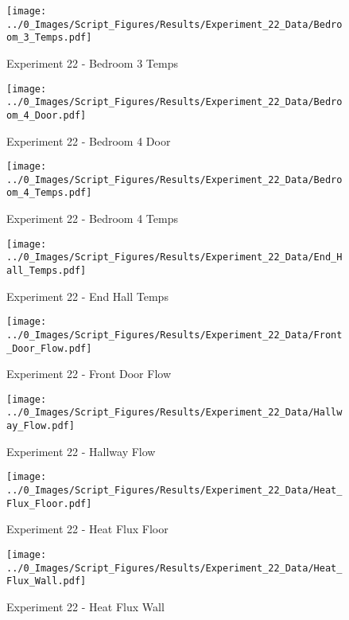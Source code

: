 	\begin{figure}[H]
		\centering
		\texttt{[image: ../0\_Images/Script\_Figures/Results/Experiment\_22\_Data/Bedroom\_3\_Temps.pdf]}
		\caption[]{Experiment 22 - Bedroom 3 Temps}
	\end{figure}
 
	\clearpage

	\begin{figure}[H]
		\centering
		\texttt{[image: ../0\_Images/Script\_Figures/Results/Experiment\_22\_Data/Bedroom\_4\_Door.pdf]}
		\caption[]{Experiment 22 - Bedroom 4 Door}
	\end{figure}
 

	\begin{figure}[H]
		\centering
		\texttt{[image: ../0\_Images/Script\_Figures/Results/Experiment\_22\_Data/Bedroom\_4\_Temps.pdf]}
		\caption[]{Experiment 22 - Bedroom 4 Temps}
	\end{figure}
 
	\clearpage

	\begin{figure}[H]
		\centering
		\texttt{[image: ../0\_Images/Script\_Figures/Results/Experiment\_22\_Data/End\_Hall\_Temps.pdf]}
		\caption[]{Experiment 22 - End Hall Temps}
	\end{figure}
 

	\begin{figure}[H]
		\centering
		\texttt{[image: ../0\_Images/Script\_Figures/Results/Experiment\_22\_Data/Front\_Door\_Flow.pdf]}
		\caption[]{Experiment 22 - Front Door Flow}
	\end{figure}
 
	\clearpage

	\begin{figure}[H]
		\centering
		\texttt{[image: ../0\_Images/Script\_Figures/Results/Experiment\_22\_Data/Hallway\_Flow.pdf]}
		\caption[]{Experiment 22 - Hallway Flow}
	\end{figure}
 

	\begin{figure}[H]
		\centering
		\texttt{[image: ../0\_Images/Script\_Figures/Results/Experiment\_22\_Data/Heat\_Flux\_Floor.pdf]}
		\caption[]{Experiment 22 - Heat Flux Floor}
	\end{figure}
 
	\clearpage

	\begin{figure}[H]
		\centering
		\texttt{[image: ../0\_Images/Script\_Figures/Results/Experiment\_22\_Data/Heat\_Flux\_Wall.pdf]}
		\caption[]{Experiment 22 - Heat Flux Wall}
	\end{figure}
 


